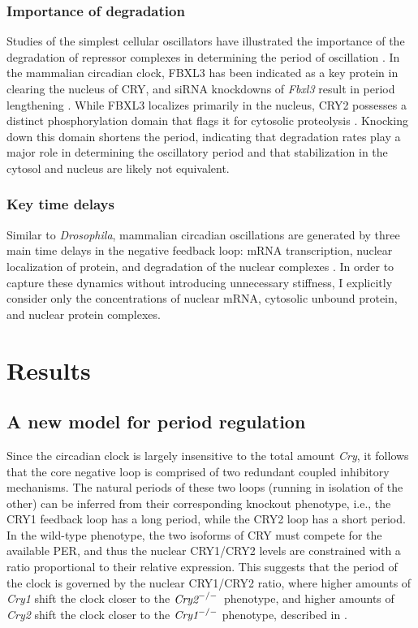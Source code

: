 \subsubsection{Importance of degradation}
Studies of the simplest cellular oscillators have illustrated the importance of the degradation of repressor complexes in determining the period of oscillation \cite{Cookson2009}.
In the mammalian circadian clock, FBXL3 has been indicated as a key protein in clearing the nucleus of CRY, and siRNA knockdowns of {\it Fbxl3} result in period lengthening \cite{Zhang2009}.
While FBXL3 localizes primarily in the nucleus, CRY2 possesses a distinct phosphorylation domain that flags it for cytosolic proteolysis \cite{Kurabayashi2010}.
Knocking down this domain shortens the period, indicating that degradation rates play a major role in determining the oscillatory period and that stabilization in the cytosol and nucleus are likely not equivalent.

\subsubsection{Key time delays}
Similar to {\it Drosophila}, mammalian circadian oscillations are generated by three main time delays in the negative feedback loop: mRNA transcription, nuclear localization of protein, and degradation of the nuclear complexes \cite{Vielhaber2000a}.
In order to capture these dynamics without introducing unnecessary stiffness, I explicitly consider only the concentrations of nuclear mRNA, cytosolic unbound protein, and nuclear protein complexes.

\section{Results}

\subsection{A new model for period regulation}
Since the circadian clock is largely insensitive to the total amount {\it Cry}, it follows that the core negative loop is comprised of two redundant coupled inhibitory mechanisms. 
The natural periods of these two loops (running in isolation of the other) can be inferred from their corresponding knockout phenotype, i.e., the CRY1 feedback loop has a long period, while the CRY2 loop has a short period. 
In the wild-type phenotype, the two isoforms of CRY must compete for the available PER, and thus the nuclear CRY1/CRY2 levels are constrained with a ratio proportional to their relative expression. 
This suggests that the period of the clock is governed by the nuclear CRY1/CRY2 ratio, where higher amounts of {\it Cry1} shift the clock closer to the $\text{\it Cry2}^{-/-}$ phenotype, and higher amounts of {\it Cry2} shift the clock closer to the $\text{\it Cry1}^{-/-}$ phenotype, described in .

